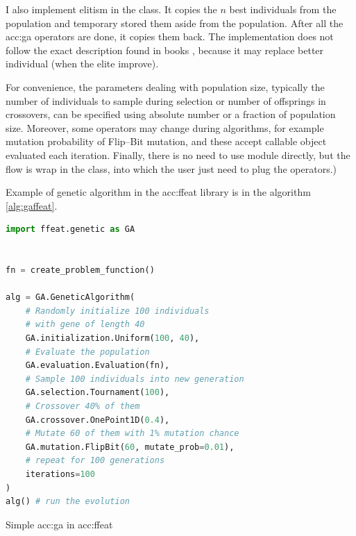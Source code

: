 I also implement elitism in the  class. It copies the $n$ best individuals from the population and temporary stored them aside from the population. After all the \acrshort{acc:ga} operators are done, it copies them back. The implementation does not follow the exact description found in books \citep{IntroductionToEA}, because it may replace better individual (when the elite improve).

For convenience, the parameters dealing with population size, typically the number of individuals to sample during selection or number of offsprings in crossovers, can be specified using absolute number or a fraction of population size. Moreover, some operators may change during algorithms, for example mutation probability of Flip--Bit mutation, and these accept callable object evaluated each iteration. Finally, there is no need to use  module directly, but the flow is wrap in the  class, into which the user just need to plug the operators.)

Example of genetic algorithm in the \acrshort{acc:ffeat} library is in the algorithm \ref{alg:gaffeat}.

\begin{algorithm}[t!]
\begin{lstlisting}[language=Python, xrightmargin=18pt]
import ffeat.genetic as GA


fn = create_problem_function()

alg = GA.GeneticAlgorithm(
    # Randomly initialize 100 individuals 
    # with gene of length 40
    GA.initialization.Uniform(100, 40),
    # Evaluate the population
    GA.evaluation.Evaluation(fn),
    # Sample 100 individuals into new generation
    GA.selection.Tournament(100),
    # Crossover 40% of them
    GA.crossover.OnePoint1D(0.4),
    # Mutate 60 of them with 1% mutation chance
    GA.mutation.FlipBit(60, mutate_prob=0.01),
    # repeat for 100 generations
    iterations=100
)
alg() # run the evolution
\end{lstlisting}
\caption{Simple \acrshort*{acc:ga} in \acrshort*{acc:ffeat}}
\label{alg:gaffeat}
\end{algorithm}




